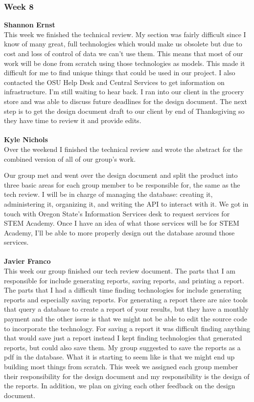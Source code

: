 \documentclass[../final.tex]{subfiles}
\begin{document}
\subsubsection{Week 8}
\textbf{Shannon Ernst}\\
This week we finished the technical review. My section was fairly difficult since I know of many great, full technologies which would make us obsolete but due to cost and loss of control of data we can't use them. This means that most of our work will be done from scratch using those technologies as models. This made it difficult for me to find unique things that could be used in our project. I also contacted the OSU Help Desk and Central Services to get information on infrastructure. I'm still waiting to hear back. I ran into our client in the grocery store and was able to discuss future deadlines for the design document. The next step is to get the design document draft to our client by end of Thanksgiving so they have time to review it and provide edits. \\ \\
\textbf{Kyle Nichols}\\
Over the weekend I finished the technical review and wrote the abstract for the combined version of all of our group's work.

Our group met and went over the design document and split the product into three basic areas for each group member to be responsible for, the same as the tech review. I will be in charge of managing the database: creating it, administering it, organizing it, and writing the API to interact with it. We got in touch with Oregon State's Information Services desk to request services for STEM Academy. Once I have an idea of what those services will be for STEM Academy, I'll be able to more properly design out the database around those services. \\ \\
\textbf{Javier Franco}\\
This week our group finished our tech review document. The parts that I am responsible for include generating reports, saving reports, and printing a report. The parts that I had a difficult time finding technologies for include generating reports and especially saving reports. For generating a report there are nice tools that query a database to create a report of your results, but they have a monthly payment and the other issue is that we might not be able to edit the source code to incorporate the technology. For saving a report it was difficult finding anything that would save just a report instead I kept finding technologies that generated reports, but could also save them. My group suggested to save the reports as a pdf in the database. What it is starting to seem like is that we might end up building most things from scratch. This week we assigned each group member their responsibility for the design document and my responsibility is the design of the reports. In addition, we plan on giving each other feedback on the design document. \\
\end{document}
